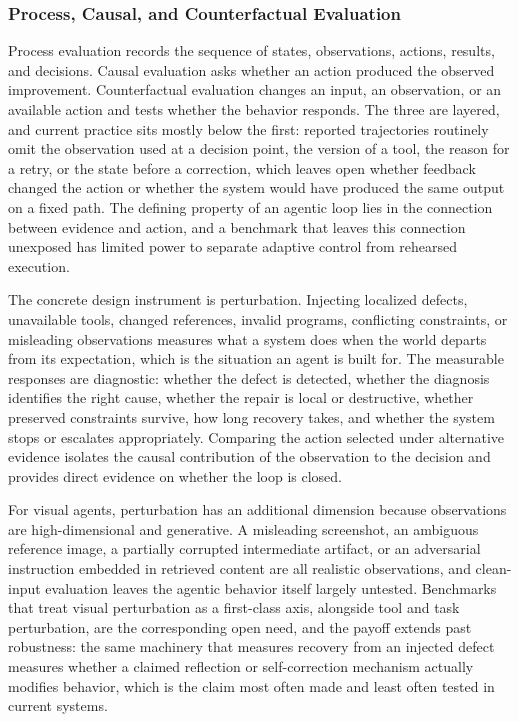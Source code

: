 \subsubsection{Process, Causal, and Counterfactual Evaluation}

Process evaluation records the sequence of states, observations, actions, results, and decisions. Causal evaluation asks whether an action produced the observed improvement. Counterfactual evaluation changes an input, an observation, or an available action and tests whether the behavior responds. The three are layered, and current practice sits mostly below the first: reported trajectories routinely omit the observation used at a decision point, the version of a tool, the reason for a retry, or the state before a correction, which leaves open whether feedback changed the action or whether the system would have produced the same output on a fixed path. The defining property of an agentic loop lies in the connection between evidence and action, and a benchmark that leaves this connection unexposed has limited power to separate adaptive control from rehearsed execution.

The concrete design instrument is perturbation. Injecting localized defects, unavailable tools, changed references, invalid programs, conflicting constraints, or misleading observations measures what a system does when the world departs from its expectation, which is the situation an agent is built for. The measurable responses are diagnostic: whether the defect is detected, whether the diagnosis identifies the right cause, whether the repair is local or destructive, whether preserved constraints survive, how long recovery takes, and whether the system stops or escalates appropriately. Comparing the action selected under alternative evidence isolates the causal contribution of the observation to the decision and provides direct evidence on whether the loop is closed.

For visual agents, perturbation has an additional dimension because observations are high-dimensional and generative. A misleading screenshot, an ambiguous reference image, a partially corrupted intermediate artifact, or an adversarial instruction embedded in retrieved content are all realistic observations, and clean-input evaluation leaves the agentic behavior itself largely untested. Benchmarks that treat visual perturbation as a first-class axis, alongside tool and task perturbation, are the corresponding open need, and the payoff extends past robustness: the same machinery that measures recovery from an injected defect measures whether a claimed reflection or self-correction mechanism actually modifies behavior, which is the claim most often made and least often tested in current systems.

